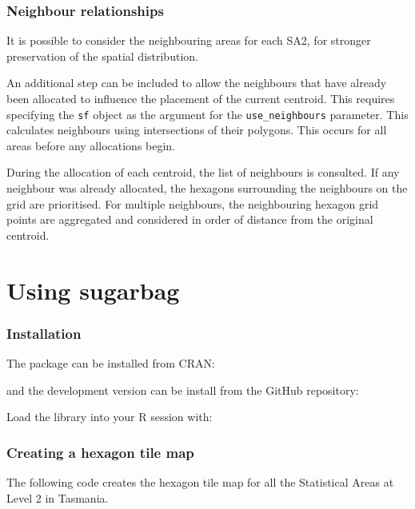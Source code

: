 \documentclass{monashthesis}
\begin{document}
\hypertarget{neighbour-relationships}{%
\subsubsection{Neighbour relationships}\label{neighbour-relationships}}

It is possible to consider the neighbouring areas for each SA2, for stronger preservation of the spatial distribution.

An additional step can be included to allow the neighbours that have already been allocated to influence the placement of the current centroid.
This requires specifying the \texttt{sf} object as the argument for the \texttt{use\_neighbours} parameter. This calculates neighbours using intersections of their polygons. This occurs for all areas before any allocations begin.

During the allocation of each centroid, the list of neighbours is consulted. If any neighbour was already allocated, the hexagons surrounding the neighbours on the grid are prioritised. For multiple neighbours, the neighbouring hexagon grid points are aggregated and considered in order of distance from the original centroid.

\hypertarget{using-sugarbag}{%
\section{Using sugarbag}\label{using-sugarbag}}

\hypertarget{installation}{%
\subsubsection{Installation}\label{installation}}

The package can be installed from CRAN:

and the development version can be install from the GitHub repository:

Load the library into your R session with:

\hypertarget{creating-a-hexagon-tile-map}{%
\subsubsection{Creating a hexagon tile map}\label{creating-a-hexagon-tile-map}}

The following code creates the hexagon tile map for all the Statistical Areas at Level 2 in Tasmania.
\end{document}
